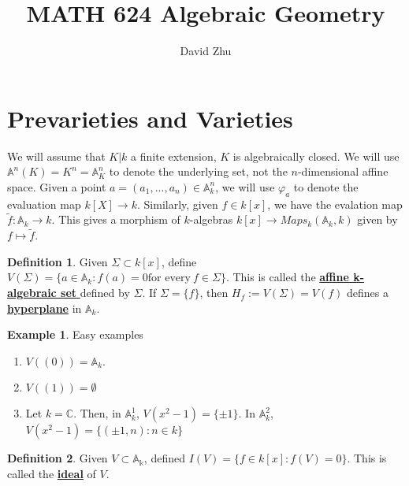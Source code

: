 \documentclass{article}
\title{MATH 624 Algebraic Geometry}
\author{David Zhu}
\theoremstyle{definition}
\theoremstyle{definition}
\newtheorem{definition}{Definition}[theorem]
\theoremstyle{definition}
\theoremstyle{definition}
\theoremstyle{definition}
\theoremstyle{definition}
\theoremstyle{definition}
\newtheorem{example}{Example}[theorem]
\begin{document}
\maketitle

\section{Prevarieties and Varieties}

We will assume that $K|k$ a finite extension, $K$ is algebraically closed. We will use $\mathbb{A}^n(K)=K^n=\mathbb{A}^n_K$ to denote the underlying set, not the $n$-dimensional affine space. Given a point $a=(a_1,...,a_n)\in \mathbb{A}^n_k$, we will use $\varphi_a$ to denote the evaluation map $k[X]\to k$. Similarly, given $f\in k[x]$, we have the evalation map $\tilde{f}: \mathbb{A}_k\to k$. This gives a morphism of $k$-algebras $k[x]\to Maps_k(\mathbb{A}_k,k)$ given by $f\mapsto \tilde{f}$.


\begin{tcolorbox}[colback=purple!5!white,colframe=purple!75!black]
\begin{definition}
Given $\Sigma\subset k[x]$, define $V(\Sigma)=\{ a\in \mathbb{A}_k: f(a)=0 \textrm{for every} \ f\in \Sigma\}$. This is called the \underline{\textbf{affine k-algebraic set }} defined by $\Sigma$. If $\Sigma=\{f\}$, then $H_f:=V(\Sigma)=V(f)$ defines a \underline{\textbf{hyperplane}} in $\mathbb{A}_k$.
\end{definition}
\end{tcolorbox}



\begin{tcolorbox}[colback=yellow!5!white,colframe=yellow!30!white]
\begin{example}
Easy examples
    \begin{enumerate}
        \item $V((0))=\mathbb{A}_k$. 
        \item $V((1))=\emptyset$
        \item Let $k=\mathbb{C}$. Then, in $\mathbb{A}_k^1$, $V(x^2-1)=\{\pm 1\}$. In $\mathbb{A}_k^2$, $V(x^2-1)=\{(\pm 1,n): n\in k\}$

    \end{enumerate}

\end{example}
\end{tcolorbox}

\begin{tcolorbox}[colback=purple!5!white,colframe=purple!75!black]
\begin{definition}
Given $V\subset \mathbb{A_k}$, defined $I(V)=\{ f\in k[x]: f(V)=0 \}$. This is called the \underline{\textbf{ideal}} of $V$.  
\end{definition}
\end{tcolorbox}
\end{document}
